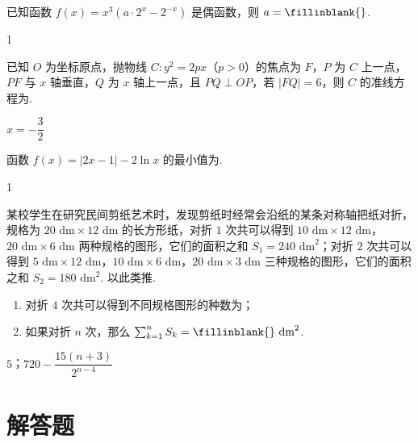 \begin{problem}
已知函数 \(f(x)=x^3\left( a\cdot 2^x-2^{-x} \right)\) 是偶函数，则 \(a=\fillinblank{}\).
\end{problem}

\begin{answer}
1
\end{answer}

\begin{problem}
已知 \(O\) 为坐标原点，抛物线 \(C:y^2=2px\)（\(p>0\)）的焦点为 \(F\)，\(P\) 为 \(C\) 上一点，\(PF\) 与 \(x\) 轴垂直，\(Q\) 为 \(x\) 轴上一点，且 \(PQ\perp OP\)，若 \(|FQ|=6\)，则 \(C\) 的准线方程为\fillinblank{}.
\end{problem}

\begin{answer}
\(x=-\dfrac{3}{2}\)
\end{answer}

\begin{problem}
函数 \(f(x)=|2x-1|-2\ln x\) 的最小值为\fillinblank{}.
\end{problem}

\begin{answer}
1
\end{answer}

\begin{problem}
某校学生在研究民间剪纸艺术时，发现剪纸时经常会沿纸的某条对称轴把纸对折，规格为 \(20\text{ dm}\times 12\text{ dm}\) 的长方形纸，对折 \(1\) 次共可以得到 \(10\text{ dm}\times 12\text{ dm}\)，\(20\text{ dm}\times 6\text{ dm}\) 两种规格的图形，它们的面积之和 \(S_1=240\text{ dm}^2\)；对折 \(2\) 次共可以得到 \(5\text{ dm}\times 12\text{ dm}\)，\(10\text{ dm}\times 6\text{ dm}\)，\(20\text{ dm}\times 3\text{ dm}\) 三种规格的图形，它们的面积之和 \(S_2=180\text{ dm}^2\). 以此类推.

\begin{enumerate}
\item 对折 \(4\) 次共可以得到不同规格图形的种数为\fillinblank{}；
\item 如果对折 \(n\) 次，那么 \(\sum_{k=1}^n S_k=\fillinblank{}\text{ dm}^2\).
\end{enumerate}
\end{problem}

\begin{answer}
\(5\)；\(720-\dfrac{15(n+3)}{2^{n-4}}\)
\end{answer}

\section{解答题}

